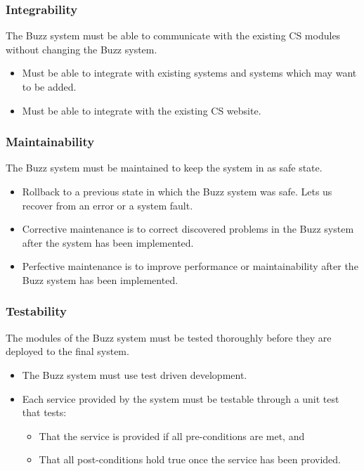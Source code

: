 \documentclass[12pt, oneside]{article}
\begin{document}
	\subsubsection*{Integrability}
	The Buzz system must be able to communicate with the existing CS modules without changing the Buzz system.
	\begin{itemize}
		\item Must be able to integrate with existing systems and systems which may want to be added.
		\item Must be able to integrate with the existing CS website.
	\end{itemize}
	
	\subsubsection*{Maintainability}
	The Buzz system must be maintained to keep the system in as safe state.
	\begin{itemize}
		\item Rollback to a previous state in which the Buzz system was safe. Lets us recover from an error or a system fault.
		\item Corrective maintenance is to correct discovered problems in the Buzz system after the system has been implemented.
		\item Perfective maintenance is to improve performance or maintainability after the Buzz system has been implemented.
	\end{itemize}
	
	\subsubsection*{Testability}
	The modules of the Buzz system must be tested thoroughly before they are deployed to the final system.
	\begin{itemize}
		\item The Buzz system must use test driven development.
		\item Each service provided by the system must be testable through a unit test that tests:
		\begin{itemize}
			\item That the service is provided if all pre-conditions are met, and
			\item That all post-conditions hold true once the service has been provided.
		\end{itemize}
	\end{itemize}
	
\end{document}
